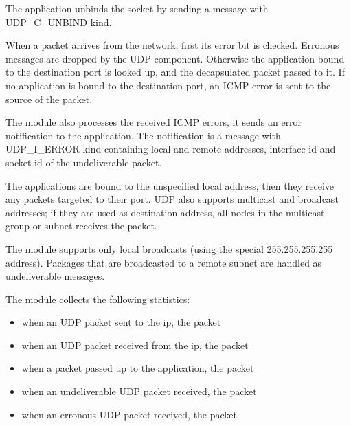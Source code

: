 The application unbinds the socket by sending a message with UDP\_C\_UNBIND kind.


When a packet arrives from the network, first its error bit is checked. Erronous messages
are dropped by the UDP component. Otherwise the application bound to the destination port
is looked up, and the decapsulated packet passed to it. If no application is bound to
the destination port, an ICMP error is sent to the source of the packet.

The  module also processes the received ICMP errors, it sends an error
notification to the application. The notification is a message with UDP\_I\_ERROR
kind containing local and remote addresses, interface id and socket id of the undeliverable packet.

The applications are bound to the unspecified local address, then they receive any packets
targeted to their port. UDP also supports multicast and broadcast addresses; if they
are used as destination address, all nodes in the multicast group or subnet receives the packet.
\begin{note}
The  module supports only local broadcasts (using the special 255.255.255.255 address).
Packages that are broadcasted to a remote subnet are handled as undeliverable messages.
\end{note}

The  module collects the following statistics:
\begin{itemize}
  \item {} when an UDP packet sent to the ip, the packet
  \item {} when an UDP packet received from the ip, the packet
  \item {} when a packet passed up to the application, the packet
  \item {} when an undeliverable UDP packet received, the packet
  \item {} when an erronous UDP packet received, the packet
\end{itemize}

%
%                            
%                            

